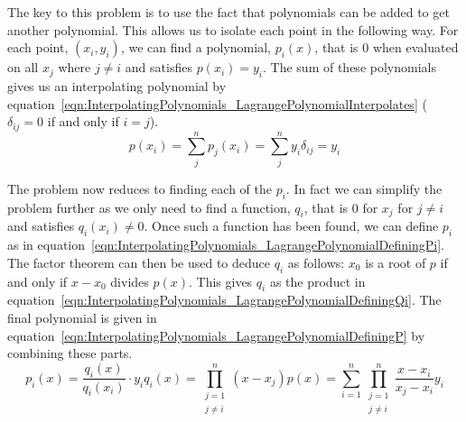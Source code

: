 \begin{parts}
	\begin{solution}
		\label{sol:InterpolatingPolynomials_Existence}
		
		The key to this problem is to use the fact that polynomials can be added to get another polynomial. This allows us to isolate each point in the following way. For each point, $(x_i, y_i)$, we can find a polynomial, $p_i(x)$, that is $0$ when evaluated on all $x_j$ where $j \ne i$ and satisfies $p(x_i) = y_i$. The sum of these polynomials gives us an interpolating polynomial by equation~\eqref{eqn:InterpolatingPolynomials_LagrangePolynomialInterpolates} ($\delta_{ij} = 0$ if and only if $i = j$).
		\begin{equation}
			p(x_i) = \sum_j^n p_j(x_i) = \sum_j^n y_i \delta_{ij} = y_i
			\label{eqn:InterpolatingPolynomials_LagrangePolynomialInterpolates}
		\end{equation}
		
		The problem now reduces to finding each of the $p_i$. In fact we can simplify the problem further as we only need to find a function, $q_i$, that is $0$ for $x_j$ for $j \ne i$ and satisfies $q_i(x_i) \ne 0$. Once such a function has been found, we can define $p_i$ as in equation~\eqref{eqn:InterpolatingPolynomials_LagrangePolynomialDefiningPi}. The factor theorem can then be used to deduce $q_i$ as follows: $x_0$ is a root of $p$ if and only if $x - x_0$ divides $p(x)$. This gives $q_i$ as the product in equation~\eqref{eqn:InterpolatingPolynomials_LagrangePolynomialDefiningQi}. The final polynomial is given in equation~\eqref{eqn:InterpolatingPolynomials_LagrangePolynomialDefiningP} by combining these parts.
		\begin{subequations}
			\begin{equation}
				p_i(x) = \frac{q_i(x)}{q_i(x_i)} \cdot y_i
				\label{eqn:InterpolatingPolynomials_LagrangePolynomialDefiningPi}
			\end{equation}
			\begin{equation}
				q_i(x) = \prod_{\substack{j=1 \\ j \ne i}}^n (x - x_j)
				\label{eqn:InterpolatingPolynomials_LagrangePolynomialDefiningQi}
			\end{equation}
			\begin{equation}
				p(x) = \sum_{i=1}^n \prod_{\substack{j=1 \\ j \ne i}}^n \frac{x - x_i}{x_j - x_i} y_i
				\label{eqn:InterpolatingPolynomials_LagrangePolynomialDefiningP}
			\end{equation}
		\end{subequations}
		

\end{solution}
\end{parts}
